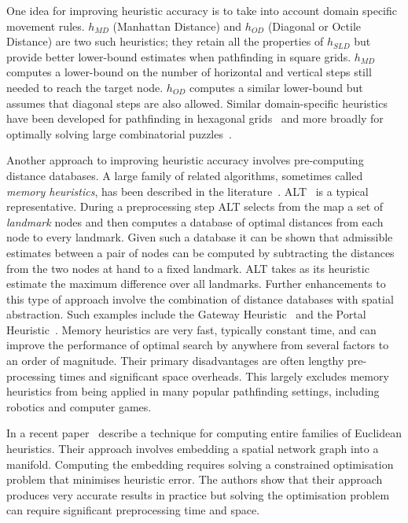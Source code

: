 One idea for improving heuristic accuracy is to take into account domain
specific movement rules.  $h_{MD}$ (Manhattan Distance) and $h_{OD}$ (Diagonal
or Octile Distance) are two such heuristics; they retain all the properties of
$h_{SLD}$ but provide better lower-bound estimates when pathfinding in square
grids. $h_{MD}$ computes a lower-bound on the number of horizontal and vertical
steps still needed to reach the target node. $h_{OD}$ computes a similar
lower-bound but assumes that diagonal steps are also allowed.  Similar
domain-specific heuristics have been developed for pathfinding in hexagonal
grids~\citep{yap02} and more broadly for optimally solving large combinatorial
puzzles~\citep{korf96}.

Another approach to improving heuristic accuracy involves pre-computing
distance databases.  A large family of related algorithms, sometimes called
\emph{memory heuristics}, has been described in the
literature~\citep{goldberg05,bjornsson06,sturtevant07,felner09,goldenberg10,anderson10}.
ALT~\citep{goldberg05} is a typical representative. During a preprocessing
step ALT selects from the map a set of \emph{landmark} nodes and then computes
a database of optimal distances from each node to every landmark. Given such a
database it can be shown that admissible estimates between a pair of nodes can
be computed by subtracting the distances from the two nodes at hand to a fixed
landmark.  ALT takes as its heuristic estimate the maximum difference over all
landmarks.  Further enhancements to this type of approach involve the
combination of distance databases with spatial abstraction. Such examples
include the Gateway Heuristic~\citep{bjornsson06} and the Portal
Heuristic~\citep{goldenberg10}. Memory heuristics are very fast, typically
constant time, and can improve the performance of optimal search by anywhere
from several factors to an order of magnitude. Their primary disadvantages are
often lengthy pre-processing times and significant space overheads.  This
largely excludes memory heuristics from being applied in many popular
pathfinding settings, including robotics and computer games.

In a recent paper~\cite{rayner11} describe a technique for computing entire
families of Euclidean heuristics. Their approach involves
embedding a spatial network graph into a manifold. Computing the embedding
requires solving a constrained optimisation problem that minimises heuristic
error. The authors show that their approach produces very accurate results in
practice but solving the optimisation problem can require significant
preprocessing time and space.  

